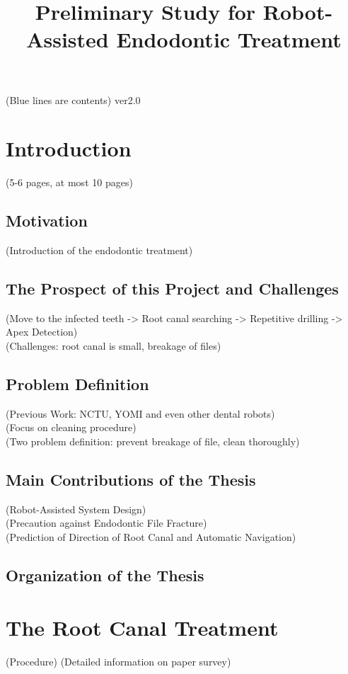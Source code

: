 \documentclass[12pt]{report}
\begin{document}
\begin{CJK}{UTF8}{bsmi}
\title{Preliminary Study for Robot-Assisted Endodontic Treatment}
(Blue lines are contents)
ver2.0
\chapter{Introduction}
(5-6 pages, at most 10 pages)
\section{Motivation}
(Introduction of the endodontic treatment)
\section{The Prospect of this Project and Challenges}
(Move to the infected teeth -> Root canal searching -> Repetitive drilling -> Apex Detection)\\
(Challenges: root canal is small, breakage of files)\\
\section{Problem Definition}
(Previous Work: NCTU, YOMI and even other dental robots)\\
(Focus on cleaning procedure)\\
(Two problem definition: prevent breakage of file, clean thoroughly)\\
\section{Main Contributions of the Thesis}
(Robot-Assisted System Design)\\
(Precaution against Endodontic File Fracture)\\
(Prediction of Direction of Root Canal and Automatic Navigation)\\
\section{Organization of the Thesis}
\chapter{The Root Canal Treatment}
(Procedure)
(Detailed information on paper survey)

\end{CJK}
\end{document}
